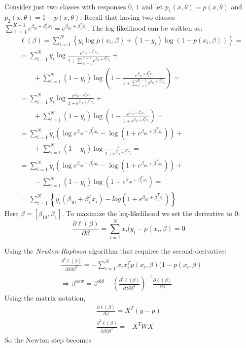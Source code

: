 Consider just two classes with responses $0$, $1$ and let $p_1(x,\theta) =p(x,\theta) $ and $p_2(x,\theta) =1-p(x,\theta)$. Recall that having two classes $\sum_{\ell=1}^{K-1} e^{\beta_{l0}+\beta_\ell^Tx_i} = e^{\beta_{10}+\beta_1^Tx_i}$. The log-likelihood can be written as:
\begin{equation}
\begin{aligned}
&\ell(\beta) = \sum_{i=1}^N \left\lbrace y_i \log p\left(x_i,\beta\right) + \left(1-y_i\right) \log \left(1-p\left(x_i,\beta\right)\right)\right\rbrace =\\
&=\sum_{i=1}^N y_i \log \frac{e^{\beta_{10} +\beta_{1}^T x_i}}{1+\sum_{\ell=1}^{K-1} e^{\beta_{l0}+\beta_\ell^Tx_i}}  +\\
& \quad\quad + \sum_{i=1}^N \left(1-y_i\right) \log \left(1-\frac{e^{\beta_{10} +\beta_{1}^T x_i}}{1+\sum_{\ell=1}^{K-1} e^{\beta_{l0}+\beta_\ell^Tx_i}}\right)= \\
&= \sum_{i=1}^N  y_i \log \frac{e^{\beta_{10} +\beta_{1}^T x_i}}{1+e^{\beta_{10}+\beta_1^Tx_i}} + \\
&\quad\quad +\sum_{i=1}^N  \left(1-y_i\right) \log \left(1-\frac{e^{\beta_{10} +\beta_{1}^T x_i}}{1+e^{\beta_{10}+\beta_1^Tx_i}}\right) = \\
&=\sum_{i=1}^N y_i \left(\log e^{\beta_{10} +\beta_{1}^T x_i} -\log \left(1+ e^{\beta_{10}+\beta_1^Tx_i}\right) \right) + \\
& \quad\quad + \sum_{i=1}^N  \left(1-y_i\right) \log \frac{1}{1+ e^{\beta_{10}+\beta_1^Tx_i}} = \\
&=\sum_{i=1}^N y_i \left(\log e^{\beta_{10} +\beta_{1}^T x_i} -\log \left(1+ e^{\beta_{10}+\beta_1^Tx_i}\right) \right) + \\
& \quad\quad - \sum_{i=1}^N\left(1-y_i\right) \log \left(1+ e^{\beta_{10}+\beta_1^Tx_i}\right) = \\
&=\sum_{i=1}^N \left\lbrace y_i \left(\beta_{10} +\beta_{1}^T x_i \right) -log \left(1+ e^{\beta_{10}+\beta_1^Tx_i}\right) \right\rbrace
\end{aligned}
\end{equation}
Here $\beta = \left[ \beta_{10}, \beta_1\right]$. To maximize the log-likelihood we set the derivative to $0$:
\begin{equation}
\frac{\partial \ell(\beta)}{\partial \beta} = \sum_{i=1}^N x_i  (y_i - p(x_i, \beta) = 0
\end{equation}

Using the \textit{Newton-Raphson} algorithm that requires the second-derivative:
\begin{align}
&\frac{\partial^2 \ell(\beta)}{\partial \beta \partial \beta^T} = -\sum_{i=1}^N x_ix_i^T   p(x_i, \beta) (1-p(x_i, \beta)\\
&\Rightarrow \beta^{new} = \beta^{old} - \left( \frac{\partial^2 \ell\left( \beta\right) }{\partial \beta \partial \beta^T} \right)^{-1}\frac{\partial \ell(\beta)}{\partial \beta}
\end{align}
Using the matrix notation,
\begin{align}
\frac{\partial \ell(\beta)}{\partial \beta} =  X^T (y-p) \\
\frac{\partial^2 \ell(\beta)}{\partial \beta \partial \beta^T} = -X^TWX
\end{align}
So the Newton step becomes

